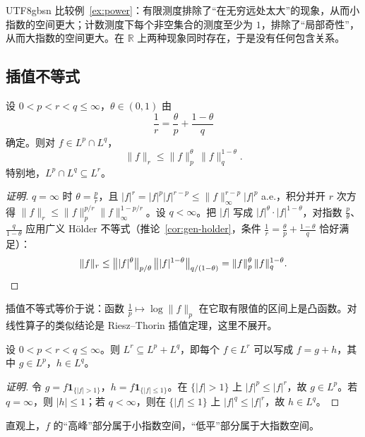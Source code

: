 \documentclass[11pt]{article}
\newcommand{\R}{\mathbb{R}}
\newcommand{\norm}[1]{\lVert #1\rVert}
\newcommand{\ind}{\mathbf{1}}
\begin{document}
\begin{CJK*}{UTF8}{gbsn}
比较例~\ref{ex:power}：有限测度排除了“在无穷远处太大”的现象，从而小指数的空间更大；计数测度下每个非空集合的测度至少为 $1$，排除了“局部奇性”，从而大指数的空间更大。在 $\R$ 上两种现象同时存在，于是没有任何包含关系。

\subsection{插值不等式}

\begin{theorem}[插值不等式]\label{thm:interpolation}
设 $0<p<r<q\le\infty$，$\theta\in(0,1)$ 由
\[
\frac1r=\frac{\theta}{p}+\frac{1-\theta}{q}
\]
确定。则对 $f\in L^{p}\cap L^{q}$，
\[
\norm{f}_{r}\le\norm{f}_{p}^{\theta}\,\norm{f}_{q}^{1-\theta}.
\]
特别地，$L^{p}\cap L^{q}\subseteq L^{r}$。
\end{theorem}

\begin{proof}[证明]
$q=\infty$ 时 $\theta=\frac pr$，且 $|f|^{r}=|f|^{p}|f|^{r-p}\le\norm{f}_{\infty}^{r-p}|f|^{p}$ a.e.，积分并开 $r$ 次方得 $\norm{f}_{r}\le\norm{f}_{p}^{p/r}\norm{f}_{\infty}^{1-p/r}$。设 $q<\infty$。把 $|f|$ 写成 $|f|^{\theta}\cdot|f|^{1-\theta}$，对指数 $\frac{p}{\theta}$、$\frac{q}{1-\theta}$ 应用广义 Hölder 不等式（推论~\ref{cor:gen-holder}，条件 $\frac1r=\frac{\theta}{p}+\frac{1-\theta}{q}$ 恰好满足）：
\[
\norm{f}_{r}\le\bigl\||f|^{\theta}\bigr\|_{p/\theta}\,\bigl\||f|^{1-\theta}\bigr\|_{q/(1-\theta)}=\norm{f}_{p}^{\theta}\,\norm{f}_{q}^{1-\theta}. \qedhere
\]
\end{proof}

\begin{remark}
插值不等式等价于说：函数 $\frac1p\mapsto\log\norm{f}_{p}$ 在它取有限值的区间上是凸函数。对线性算子的类似结论是 Riesz--Thorin 插值定理，这里不展开。
\end{remark}

\begin{corollary}\label{cor:sum}
设 $0<p<r<q\le\infty$。则 $L^{r}\subseteq L^{p}+L^{q}$，即每个 $f\in L^{r}$ 可以写成 $f=g+h$，其中 $g\in L^{p}$，$h\in L^{q}$。
\end{corollary}

\begin{proof}[证明]
令 $g=f\ind_{\{|f|>1\}}$，$h=f\ind_{\{|f|\le1\}}$。在 $\{|f|>1\}$ 上 $|f|^{p}\le|f|^{r}$，故 $g\in L^{p}$。若 $q=\infty$，则 $|h|\le1$；若 $q<\infty$，则在 $\{|f|\le1\}$ 上 $|f|^{q}\le|f|^{r}$，故 $h\in L^{q}$。
\end{proof}

直观上，$f$ 的“高峰”部分属于小指数空间，“低平”部分属于大指数空间。


\end{CJK*}
\end{document}
